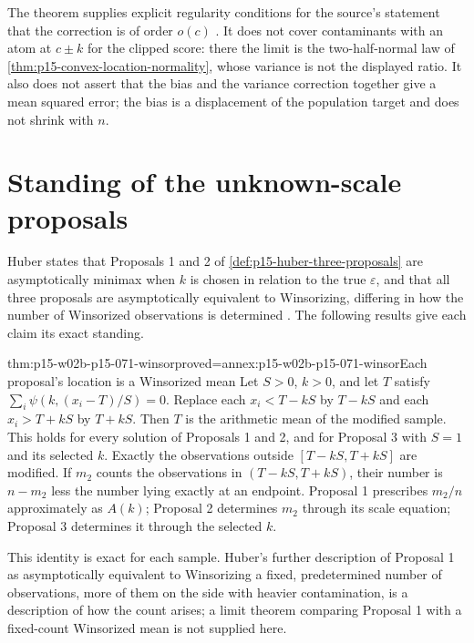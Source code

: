 The theorem supplies explicit regularity conditions for the source's
statement that the correction is of order \(o(c)\)
\cite[p.~83]{Huber1964RobustLocation}. It does not cover contaminants
with an atom at \(c\pm k\) for the clipped score: there the limit is the
two-half-normal law of \cref{thm:p15-convex-location-normality}, whose
variance is not the displayed ratio. It also does not assert that the
bias and the variance correction together give a mean squared error;
the bias is a displacement of the population target and does not shrink
with \(n\).

\section{Standing of the unknown-scale proposals}
\label{sec:p15-w02b-p15-071-proposals}

Huber states that Proposals 1 and 2 of
\cref{def:p15-huber-three-proposals} are asymptotically minimax when
\(k\) is chosen in relation to the true \(\varepsilon\), and that all
three proposals are asymptotically equivalent to Winsorizing, differing
in how the number of Winsorized observations is determined
\cite[p.~96]{Huber1964RobustLocation}. The following results give each
claim its exact standing.

\begin{hbtheorem}{thm:p15-w02b-p15-071-winsor}{proved=annex:p15-w02b-p15-071-winsor}{Each proposal's location is a Winsorized mean}
Let \(S>0\), \(k>0\), and let \(T\) satisfy
\(\sum_i\psi(k,(x_i-T)/S)=0\). Replace each \(x_i<T-kS\) by \(T-kS\)
and each \(x_i>T+kS\) by \(T+kS\). Then \(T\) is the arithmetic mean of
the modified sample. This holds for every solution of Proposals 1 and 2,
and for Proposal 3 with \(S=1\) and its selected \(k\).
Exactly the observations outside \([T-kS,T+kS]\) are modified.
If \(m_2\) counts the observations in \((T-kS,T+kS)\), their number is
\(n-m_2\) less the number lying exactly at an endpoint.
Proposal 1 prescribes \(m_2/n\) approximately as \(A(k)\); Proposal 2 determines \(m_2\) through its scale equation;
Proposal 3 determines it through the selected \(k\).
\end{hbtheorem}

This identity is exact for each sample. Huber's further description of
Proposal 1 as asymptotically equivalent to Winsorizing a fixed,
predetermined number of observations, more of them on the side with
heavier contamination, is a description of how the count arises; a
limit theorem comparing Proposal 1 with a fixed-count Winsorized mean is
not supplied here.

